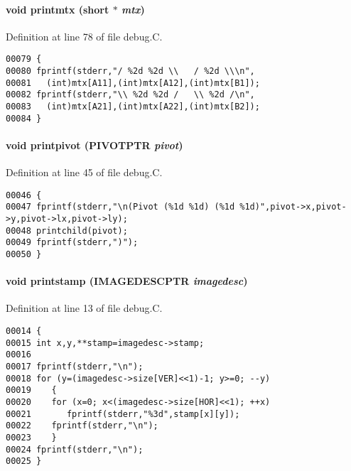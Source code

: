\paragraph{\setlength{\rightskip}{0pt plus 5cm}void printmtx (short $\ast$ {\em mtx})}\hfill



Definition at line 78 of file debug.C.\small\begin{verbatim}00079 {
00080 fprintf(stderr,"/ %2d %2d \\   / %2d \\\n",
00081   (int)mtx[A11],(int)mtx[A12],(int)mtx[B1]);
00082 fprintf(stderr,"\\ %2d %2d /   \\ %2d /\n",
00083   (int)mtx[A21],(int)mtx[A22],(int)mtx[B2]);
00084 }
\end{verbatim}\normalsize 
\label{im.h_a20}
\paragraph{\setlength{\rightskip}{0pt plus 5cm}void printpivot ({\bf PIVOTPTR} {\em pivot})}\hfill



Definition at line 45 of file debug.C.\small\begin{verbatim}00046 {
00047 fprintf(stderr,"\n(Pivot (%1d %1d) (%1d %1d)",pivot->x,pivot->y,pivot->lx,pivot->ly);
00048 printchild(pivot);
00049 fprintf(stderr,")");
00050 }
\end{verbatim}\normalsize 
\label{im.h_a18}
\paragraph{\setlength{\rightskip}{0pt plus 5cm}void printstamp ({\bf IMAGEDESCPTR} {\em imagedesc})}\hfill



Definition at line 13 of file debug.C.\small\begin{verbatim}00014 {
00015 int x,y,**stamp=imagedesc->stamp;
00016 
00017 fprintf(stderr,"\n");
00018 for (y=(imagedesc->size[VER]<<1)-1; y>=0; --y)
00019    {
00020    for (x=0; x<(imagedesc->size[HOR]<<1); ++x)
00021       fprintf(stderr,"%3d",stamp[x][y]);
00022    fprintf(stderr,"\n");
00023    }
00024 fprintf(stderr,"\n");
00025 }
\end{verbatim}\normalsize 
\label{im.h_a17}

